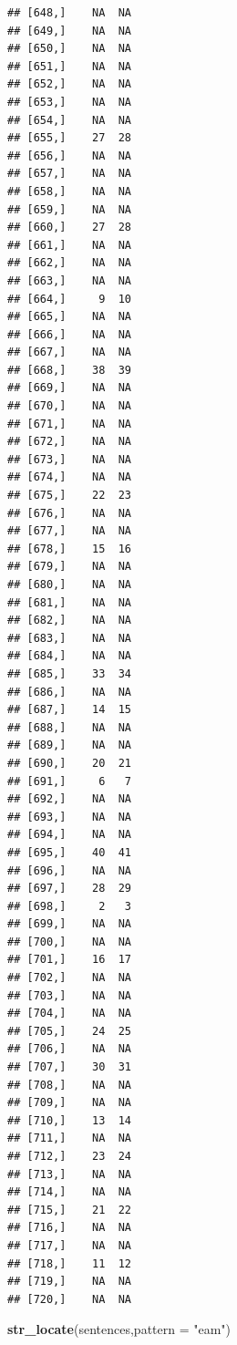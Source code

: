 \documentclass[
]{article}
\newenvironment{Shaded}{\begin{snugshade}}{\end{snugshade}}
\newcommand{\AttributeTok}[1]{\textcolor[rgb]{0.13,0.29,0.53}{#1}}
\newcommand{\FunctionTok}[1]{\textcolor[rgb]{0.13,0.29,0.53}{\textbf{#1}}}
\newcommand{\NormalTok}[1]{#1}
\newcommand{\StringTok}[1]{\textcolor[rgb]{0.31,0.60,0.02}{#1}}
\begin{document}
\begin{verbatim}
## [648,]    NA  NA
## [649,]    NA  NA
## [650,]    NA  NA
## [651,]    NA  NA
## [652,]    NA  NA
## [653,]    NA  NA
## [654,]    NA  NA
## [655,]    27  28
## [656,]    NA  NA
## [657,]    NA  NA
## [658,]    NA  NA
## [659,]    NA  NA
## [660,]    27  28
## [661,]    NA  NA
## [662,]    NA  NA
## [663,]    NA  NA
## [664,]     9  10
## [665,]    NA  NA
## [666,]    NA  NA
## [667,]    NA  NA
## [668,]    38  39
## [669,]    NA  NA
## [670,]    NA  NA
## [671,]    NA  NA
## [672,]    NA  NA
## [673,]    NA  NA
## [674,]    NA  NA
## [675,]    22  23
## [676,]    NA  NA
## [677,]    NA  NA
## [678,]    15  16
## [679,]    NA  NA
## [680,]    NA  NA
## [681,]    NA  NA
## [682,]    NA  NA
## [683,]    NA  NA
## [684,]    NA  NA
## [685,]    33  34
## [686,]    NA  NA
## [687,]    14  15
## [688,]    NA  NA
## [689,]    NA  NA
## [690,]    20  21
## [691,]     6   7
## [692,]    NA  NA
## [693,]    NA  NA
## [694,]    NA  NA
## [695,]    40  41
## [696,]    NA  NA
## [697,]    28  29
## [698,]     2   3
## [699,]    NA  NA
## [700,]    NA  NA
## [701,]    16  17
## [702,]    NA  NA
## [703,]    NA  NA
## [704,]    NA  NA
## [705,]    24  25
## [706,]    NA  NA
## [707,]    30  31
## [708,]    NA  NA
## [709,]    NA  NA
## [710,]    13  14
## [711,]    NA  NA
## [712,]    23  24
## [713,]    NA  NA
## [714,]    NA  NA
## [715,]    21  22
## [716,]    NA  NA
## [717,]    NA  NA
## [718,]    11  12
## [719,]    NA  NA
## [720,]    NA  NA
\end{verbatim}

\begin{Shaded}
\begin{Highlighting}[]
\FunctionTok{str\_locate}\NormalTok{(sentences,}\AttributeTok{pattern =} \StringTok{"eam"}\NormalTok{)}
\end{Highlighting}
\end{Shaded}
\end{document}
